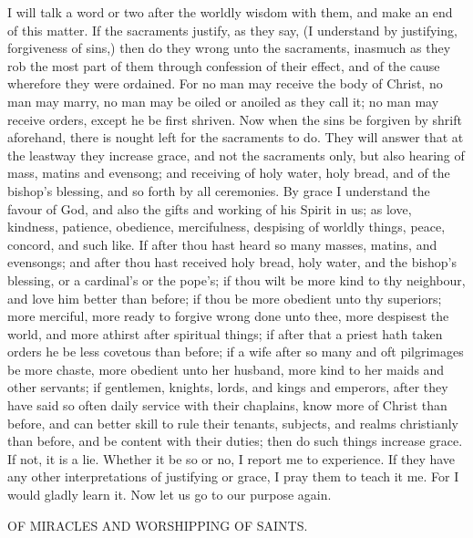 I will talk a word or two after the worldly wisdom with 
them, and make an end of this matter. If the sacraments 
justify, as they say, (I understand by justifying, forgiveness 
of sins,) then do they wrong unto the sacraments, inasmuch
as they rob the most part of them through confession 
of their effect, and of the cause wherefore they were ordained.
For no man may receive the body of Christ, no 
man may marry, no man may be oiled or anoiled as they call 
it; no man may receive orders, except he be first shriven. 
Now when the sins be forgiven by shrift aforehand, there 
is nought left for the sacraments to do. They will answer 
that at the leastway they increase grace, and not the sacraments
only, but also hearing of mass, matins and evensong;
and receiving of holy water, holy bread, and of the 
bishop's blessing, and so forth by all ceremonies. By 
grace I understand the favour of God, and also the gifts 
and working of his Spirit in us; as love, kindness, 
patience, obedience, mercifulness, despising of worldly 
things, peace, concord, and such like. If after thou hast 
heard so many masses, matins, and evensongs; and after 
thou hast received holy bread, holy water, and the bishop's 
blessing, or a cardinal's or the pope's; if thou wilt be 
more kind to thy neighbour, and love him better than 
before; if thou be more obedient unto thy superiors; more 
merciful, more ready to forgive wrong done unto thee, 
more despisest the world, and more athirst after spiritual 
things; if after that a priest hath taken orders he be less 
covetous than before; if a wife after so many and oft pilgrimages
be more chaste, more obedient unto her husband,
more kind to her maids and other servants; if gentlemen,
knights, lords, and kings and emperors, after they 
have said so often daily service with their chaplains, know 
more of Christ than before, and can better skill to rule their 
tenants, subjects, and realms christianly than before, and 
be content with their duties; then do such things increase 
grace. If not, it is a lie. Whether it be so or no, I report 
me to experience. If they have any other interpretations 
of justifying or grace, I pray them to teach it me. For I 
would gladly learn it. Now let us go to our purpose 
again. 


OF MIRACLES AND WORSHIPPING OF SAINTS. 

